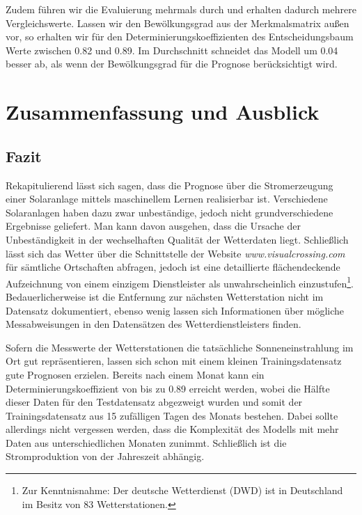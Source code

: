 \documentclass[12pt, a4paper]{article}
\begin{document}
Zudem führen wir die Evaluierung mehrmals durch und erhalten dadurch mehrere Vergleichswerte. Lassen wir den Bewölkungsgrad aus der Merkmalsmatrix außen vor, so erhalten wir für den Determinierungskoeffizienten des Entscheidungsbaum Werte zwischen 0.82 und 0.89. Im Durchschnitt schneidet das Modell um 0.04 besser ab, als wenn der Bewölkungsgrad für die Prognose berücksichtigt wird. 



\newpage

\section{Zusammenfassung und Ausblick}
\label{sec:conclusion_outlook}

\subsection{Fazit}

Rekapitulierend lässt sich sagen, dass die Prognose über die Stromerzeugung einer Solaranlage mittels maschinellem Lernen realisierbar ist. Verschiedene Solaranlagen haben dazu zwar unbeständige, jedoch nicht grundverschiedene Ergebnisse geliefert. Man kann davon ausgehen, dass die Ursache der Unbeständigkeit in der wechselhaften Qualität der Wetterdaten liegt. Schließlich lässt sich das Wetter über die Schnittstelle der Website \textit{www.visualcrossing.com} für sämtliche Ortschaften abfragen, jedoch ist eine detaillierte flächendeckende Aufzeichnung von einem einzigem Dienstleister als unwahrscheinlich einzustufen\footnote{Zur Kenntnisnahme: Der deutsche Wetterdienst (DWD) ist in Deutschland im Besitz von 83 Wetterstationen.}. Bedauerlicherweise ist die Entfernung zur nächsten Wetterstation nicht im Datensatz dokumentiert, ebenso wenig lassen sich Informationen über mögliche Messabweisungen in den Datensätzen des Wetterdienstleisters finden.


Sofern die Messwerte der Wetterstationen die tatsächliche Sonneneinstrahlung im Ort gut repräsentieren, lassen sich schon mit einem kleinen Trainingsdatensatz gute Prognosen erzielen. Bereits nach einem Monat kann ein Determinierungskoeffizient von bis zu 0.89 erreicht werden, wobei die Hälfte dieser Daten für den Testdatensatz abgezweigt wurden und somit der Trainingsdatensatz aus 15 zufälligen Tagen des Monats bestehen. Dabei sollte allerdings nicht vergessen werden, dass die Komplexität des Modells mit mehr Daten aus unterschiedlichen Monaten zunimmt. Schließlich ist die Stromproduktion von der Jahreszeit abhängig. 
\end{document}
